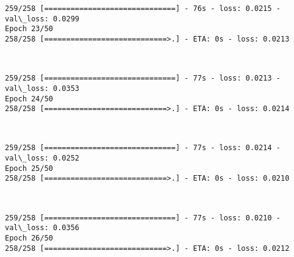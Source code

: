 \documentclass[11pt]{article}
\begin{document}
    \begin{Verbatim}[commandchars=\\\{\}]
259/258 [==============================] - 76s - loss: 0.0215 - val\_loss: 0.0299
Epoch 23/50
258/258 [============================>.] - ETA: 0s - loss: 0.0213
    \end{Verbatim}

    \begin{center}
    \end{center}
    { \hspace*{\fill} \\}
    
    \begin{Verbatim}[commandchars=\\\{\}]
259/258 [==============================] - 77s - loss: 0.0213 - val\_loss: 0.0353
Epoch 24/50
258/258 [============================>.] - ETA: 0s - loss: 0.0214
    \end{Verbatim}

    \begin{center}
    \end{center}
    { \hspace*{\fill} \\}
    
    \begin{Verbatim}[commandchars=\\\{\}]
259/258 [==============================] - 77s - loss: 0.0214 - val\_loss: 0.0252
Epoch 25/50
258/258 [============================>.] - ETA: 0s - loss: 0.0210
    \end{Verbatim}

    \begin{center}
    \end{center}
    { \hspace*{\fill} \\}
    
    \begin{Verbatim}[commandchars=\\\{\}]
259/258 [==============================] - 77s - loss: 0.0210 - val\_loss: 0.0356
Epoch 26/50
258/258 [============================>.] - ETA: 0s - loss: 0.0212
    \end{Verbatim}

    \begin{center}
    \end{center}
    { \hspace*{\fill} \\}
    
\end{document}
